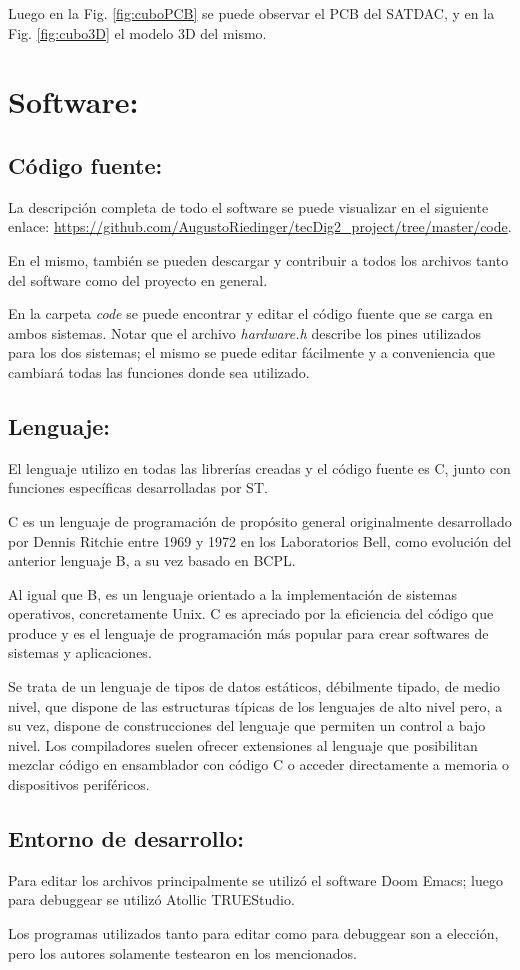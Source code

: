 \documentclass[conference]{IEEEtran}
\begin{document}
Luego en la Fig. \ref{fig:cuboPCB} se puede observar el PCB del SATDAC, y en la Fig. \ref{fig:cubo3D} el modelo 3D del mismo.

\section{Software:}
\label{sec:org76ebab6}
\subsection{Código fuente:}
\label{sec:org257aa8a}
La descripción completa de todo el software se puede visualizar en el siguiente enlace: \url{https://github.com/AugustoRiedinger/tecDig2\_project/tree/master/code}.

En el mismo, también se pueden descargar y contribuir a todos los archivos tanto del software como del proyecto en general.

En la carpeta \emph{code} se puede encontrar y editar el código fuente que se carga en ambos sistemas. Notar que el archivo \emph{hardware.h} describe los pines utilizados para los dos sistemas; el mismo se puede editar fácilmente y a conveniencia que cambiará todas las funciones donde sea utilizado.
\subsection{Lenguaje:}
\label{sec:orgcd06b6a}
El lenguaje utilizo en todas las librerías creadas y el código fuente es C, junto con funciones específicas desarrolladas por ST.

C es un lenguaje de programación de propósito general originalmente desarrollado por Dennis Ritchie entre 1969 y 1972 en los Laboratorios Bell,​ como evolución del anterior lenguaje B, a su vez basado en BCPL.

Al igual que B, es un lenguaje orientado a la implementación de sistemas operativos, concretamente Unix. C es apreciado por la eficiencia del código que produce y es el lenguaje de programación más popular para crear softwares de sistemas y aplicaciones.

Se trata de un lenguaje de tipos de datos estáticos, débilmente tipado, de medio nivel, que dispone de las estructuras típicas de los lenguajes de alto nivel pero, a su vez, dispone de construcciones del lenguaje que permiten un control a bajo nivel. Los compiladores suelen ofrecer extensiones al lenguaje que posibilitan mezclar código en ensamblador con código C o acceder directamente a memoria o dispositivos periféricos.

\subsection{Entorno de desarrollo:}
\label{sec:orgd6c0ea7}
Para editar los archivos principalmente se utilizó el software Doom Emacs; luego para debuggear se utilizó Atollic TRUEStudio.

Los programas utilizados tanto para editar como para debuggear son a elección, pero los autores solamente testearon en los mencionados.
\end{document}
